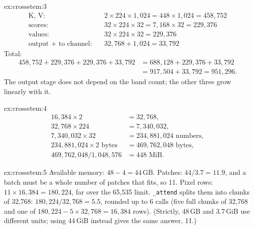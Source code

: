 \begin{solution}{ex:crossstem:3}
\begin{align*}
  \text{K, V}:&\quad 2\times224\times1{,}024 = 448\times1{,}024 = 458{,}752\\
  \text{scores}:&\quad 32\times224\times32 = 7{,}168\times32 = 229{,}376\\
  \text{values}:&\quad 32\times224\times32 = 229{,}376\\
  \text{output + to channel}:&\quad 32{,}768 + 1{,}024 = 33{,}792
\end{align*}
Total:
\begin{align*}
  458{,}752 + 229{,}376 + 229{,}376 + 33{,}792 &= 688{,}128 + 229{,}376 + 33{,}792\\
  &= 917{,}504 + 33{,}792 = 951{,}296 .
\end{align*}
The output stage does not depend on the band count; the other three grow linearly with it.
\end{solution}

\begin{solution}{ex:crossstem:4}
\begin{align*}
  16{,}384\times2 &= 32{,}768,\\
  32{,}768\times224 &= 7{,}340{,}032,\\
  7{,}340{,}032\times32 &= 234{,}881{,}024 \text{ numbers},\\
  234{,}881{,}024\times2 \text{ bytes} &= 469{,}762{,}048 \text{ bytes},\\
  469{,}762{,}048/1{,}048{,}576 &= 448 \text{ MiB}.
\end{align*}
\end{solution}

\begin{solution}{ex:crossstem:5}
Available memory: $48 - 4 = 44$\,GB. Patches: $44/3.7 = 11.9$, and a batch must be a whole number of patches that fits, so 11. Pixel rows: $11\times16{,}384 = 180{,}224$, far over the 65,535 limit. \texttt{\_attend} splits them into chunks of 32,768: $180{,}224/32{,}768 = 5.5$, rounded up to 6 calls (five full chunks of 32,768 and one of $180{,}224 - 5\times32{,}768 = 16{,}384$ rows). (Strictly, 48\,GB and 3.7\,GiB use different units; using 44\,GiB instead gives the same answer, 11.)
\end{solution}

